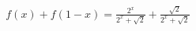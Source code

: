 \documentclass[preview]{standalone}
\begin{document}
\begin{align*}
f(x)+f(1-x)=\frac{2^x}{2^x+\sqrt{2}}+\frac{\sqrt{2}}{2^x+\sqrt{2}}
\end{align*}
\end{document}
